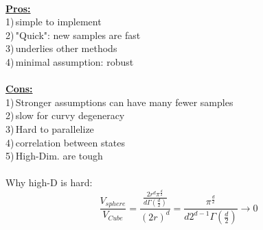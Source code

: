 \documentclass{article}
\begin{document}
\\
\textbf{\underline{Pros:}}\\
1)\,simple to implement\\
2)\,"Quick": new samples are fast\\
3)\,underlies other methods\\
4)\,minimal assumption: robust\\
\\
\textbf{\underline{Cons:}}\\
1)\,Stronger assumptions can have many fewer samples\\
2)\,slow for curvy degeneracy\\
3)\,Hard to parallelize\\
4)\,correlation between states\\
5)\,High-Dim. are tough\\
\\
Why high-D is hard:\\
\[ \frac{V_{sphere}}{V_{Cube}}=\frac{\frac{2r^d\pi^{\frac{d}{2}}}{d \Gamma(\frac{d}{2})}}{(2r)^d}=\frac{\pi^{\frac{d}{2}}}{d2^{d-1}\Gamma(\frac{d}{2})}\rightarrow 0\]
\end{document}
